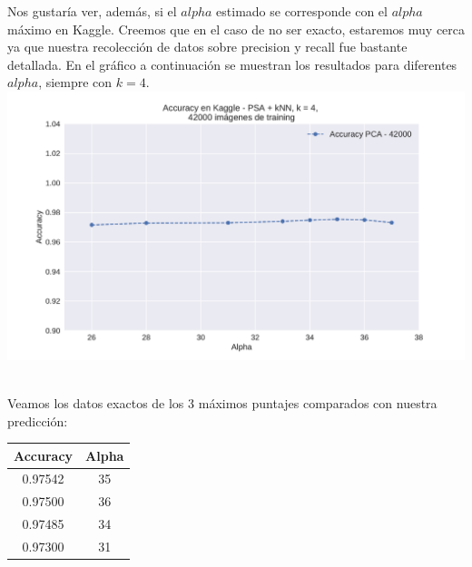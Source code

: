 Nos gustaría ver, además, si el $alpha$ estimado se corresponde con el $alpha$ máximo en Kaggle. Creemos que en el caso de no ser exacto, estaremos muy cerca ya que nuestra recolección de datos sobre precision y recall fue bastante detallada. En el gráfico a continuación se muestran los resultados para diferentes $alpha$, siempre con $k=4$. \\

{\centering
    \includegraphics[scale=0.60]{informe/imagenes/pca/clasificacionKaggle.pdf} \\
}
$ $\newline

Veamos los datos exactos de los 3 máximos puntajes comparados con nuestra predicción: \\

\begin{center}
    \begin{tabular}{| c | c |}
    \hline
     Accuracy    & Alpha  \\ \hline
     0.97542  & 35  \\ \hline
     0.97500  & 36  \\ \hline
     0.97485  & 34  \\ \hline
     0.97300  & 31  \\ \hline
    \end{tabular}
\end{center}

